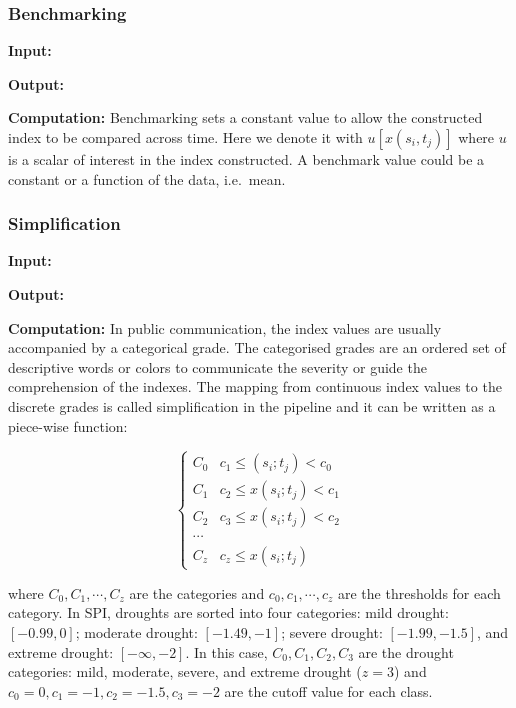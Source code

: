 \documentclass[
]{interact}
\begin{document}
\hypertarget{benchmarking}{%
\subsubsection{Benchmarking}\label{benchmarking}}

\textbf{Input: }

\textbf{Output: }

\textbf{Computation:} Benchmarking sets a constant value to allow the
constructed index to be compared across time. Here we denote it with
\(u[x(s_i, t_j)]\) where \(u\) is a scalar of interest in the index
constructed. A benchmark value could be a constant or a function of the
data, i.e.~mean.

\hypertarget{simplification}{%
\subsubsection{Simplification}\label{simplification}}

\textbf{Input: }

\textbf{Output: }

\textbf{Computation:} In public communication, the index values are
usually accompanied by a categorical grade. The categorised grades are
an ordered set of descriptive words or colors to communicate the
severity or guide the comprehension of the indexes. The mapping from
continuous index values to the discrete grades is called simplification
in the pipeline and it can be written as a piece-wise function:

\begin{equation}
\begin{cases}
C_0 & c_1 \leq (s_i; t_j) < c_0 \\
C_1 & c_2 \leq x(s_i; t_j) < c_1 \\
C_2 & c_3 \leq x(s_i; t_j) < c_2 \\
\cdots \\
C_z & c_z \leq x(s_i; t_j)
\end{cases}
\end{equation}

where \(C_0, C_1,\cdots ,C_z\) are the categories and
\(c_0, c_1, \cdots, c_z\) are the thresholds for each category. In SPI,
droughts are sorted into four categories: mild drought: \([-0.99, 0]\);
moderate drought: \([-1.49, -1]\); severe drought: \([-1.99, -1.5]\),
and extreme drought: \([-\infty, -2]\). In this case,
\(C_0, C_1, C_2, C_3\) are the drought categories: mild, moderate,
severe, and extreme drought (\(z = 3\)) and
\(c_0 =0, c_1 = -1, c_2 = -1.5, c_3 = -2\) are the cutoff value for each
class.
\end{document}
